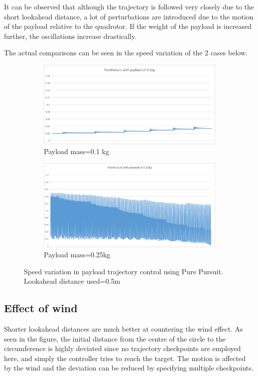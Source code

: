 \documentclass[hidelinks,BTech]{iitmdiss}
\begin{document}
It can be observed that although the trajectory is followed very closely due to the short lookahead distance, a lot of perturbations are introduced due to the motion of the payload relative to the quadrotor. If the weight of the payload is increased further, the oscillations increase drastically.

The actual comparisons can be seen in the speed variation of the 2 cases below.
\begin{figure}[H]
  \centering
  \begin{subfigure}[t]{0.48\textwidth}
    \centering
      \includegraphics[width=\textwidth]{Pure_Pursuit_speed_payload_0_1.png}
      \caption{Payload mass=0.1	kg}
  \end{subfigure}  \begin{subfigure}[t]{0.48\textwidth}
  \includegraphics[width=\textwidth]{Pure_Pursuit_speed_payload_0_25.png}
      \caption{Payload mass=0.25kg}
  \end{subfigure}
  \caption{Speed variation in payload trajectory control using Pure Pursuit. Lookahead distance used=0.5m}
\end{figure}	
\subsection {Effect of wind}
Shorter lookahead distances are much better at countering the wind effect. As seen in the figure, the initial distance from the centre of the circle to the circumference is highly deviated since no trajectory checkpoints are employed here, and simply the controller tries to reach the target. The motion is affected by the wind and the deviation can be reduced by specifying multiple checkpoints. 
\end{document}
